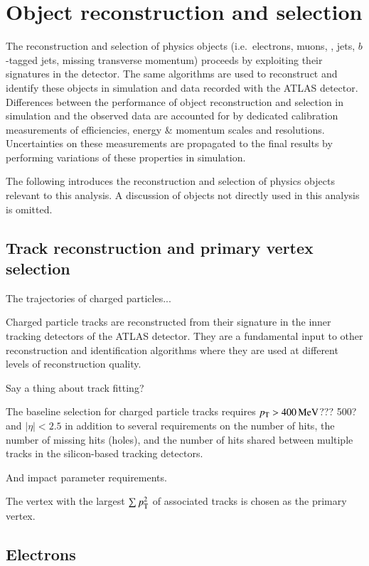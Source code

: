 \section{Object reconstruction and selection}
\label{sec:object_reconstruction}

The reconstruction and selection of physics objects (i.e.\ electrons,
muons, \tauhadvis, jets, $b$-tagged jets, missing transverse momentum)
proceeds by exploiting their signatures in the detector. The same
algorithms are used to reconstruct and identify these objects in
simulation and data recorded with the ATLAS detector. Differences
between the performance of object reconstruction and selection in
simulation and the observed data are accounted for by dedicated
calibration measurements of efficiencies, energy \& momentum scales
and resolutions. Uncertainties on these measurements are propagated to
the final results by performing variations of these properties in
simulation.

The following introduces the reconstruction and selection of physics
objects relevant to this analysis. A discussion of objects not
directly used in this analysis is omitted.


\subsection{Track reconstruction and primary vertex selection}

The trajectories of charged particles...

Charged particle tracks are reconstructed from their signature in the
inner tracking detectors of the ATLAS detector. They are a fundamental
input to other reconstruction and identification algorithms where they
are used at different levels of reconstruction quality.

Say a thing about track fitting?

The baseline selection for charged particle tracks requires
$\pT > \SI{400}{\MeV}$??? 500?  and $|\eta| < \num{2.5}$ in addition
to several requirements on the number of hits, the number of missing
hits (holes), and the number of hits shared between multiple tracks in
the silicon-based tracking detectors.

And impact parameter requirements.

The vertex with the largest $\sum p_{\text{T}}^2$ of associated tracks is
chosen as the primary vertex.

\cite{PERF-2015-08}


\subsection{Electrons}

